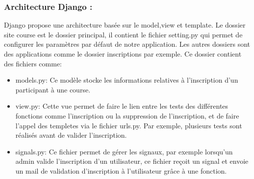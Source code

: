 \documentclass[12pt]{article} %
\begin{document}
		\subsubsection{Architecture Django :} 
            Django propose une architecture basée sur le model,view et template.  Le dossier site course est le dossier principal, il contient le fichier setting.py qui permet de configurer les paramètres par défaut de notre application. Les autres dossiers sont des applications comme le dossier inscriptions par exemple. Ce dossier contient des fichiers comme: \\
            \begin{itemize}
            \item models.py:  Ce modèle stocke les informations relatives à l'inscription d'un participant à une course.
            \item view.py: Cette vue permet de faire le lien entre les tests des différentes fonctions comme l’inscription ou la suppression de l’inscription, et de faire l'appel des templetes via le fichier urls.py. Par exemple, plusieurs tests sont réalisés avant de valider l'inscription.
            \item signals.py: Ce fichier permet de gérer les signaux, par exemple lorsqu'un admin valide l’inscription d’un utilisateur, ce fichier reçoit un signal et envoie un mail de validation d'inscription à l’utilisateur grâce à une fonction.
            \end{itemize}
\end{document}
